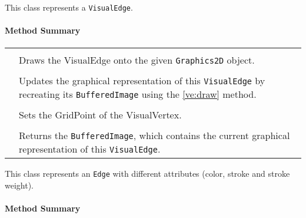 \pagebreak

This class represents a \texttt{VisualEdge}.


\centerdash

\paragraph*{Method Summary}
\paragraph*{}
\begin{longtable}{Lp{10cm}}
	\startmethodtable
	 \\
	& Draws the VisualEdge onto the given \texttt{Graphics2D} object. \\
	 \\
	& Updates the graphical representation of this \texttt{VisualEdge} by recreating its \texttt{BufferedImage} using the \ref{ve:draw} method.\\ 
	 \\
	& Sets the GridPoint of the VisualVertex. \\
	 \\
	& Returns the \texttt{BufferedImage}, which contains the current graphical representation of this \texttt{VisualEdge}. \\ 
	\hline
\end{longtable}



\pagebreak

This class represents an \texttt{Edge} with different attributes (color, stroke and stroke weight). \\

\centerdash

\paragraph*{Method Summary}
